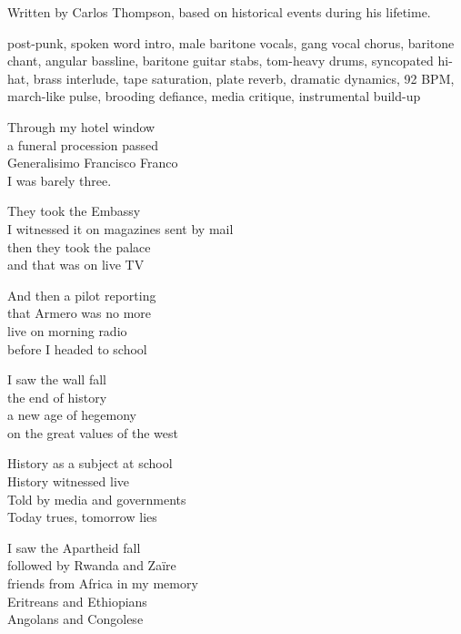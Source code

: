 
\label{sec:history-witnessed-live}
\begin{notes}
Written by Carlos Thompson, based on historical events during his lifetime.
\end{notes}
\begin{style}
post-punk, spoken word intro, male baritone vocals, gang vocal chorus, baritone chant, angular bassline, baritone guitar stabs, tom-heavy drums, syncopated hi-hat, brass interlude, tape saturation, plate reverb, dramatic dynamics, 92 BPM, march-like pulse, brooding defiance, media critique, instrumental build-up
\end{style}
\begin{lyrics}
Through my hotel window\\
a funeral procession passed\\
Generalisimo Francisco Franco\\
I was barely three.

They took the Embassy\\
I witnessed it on magazines sent by mail\\
then they took the palace\\
and that was on live TV

And then a pilot reporting\\
that Armero was no more\\
live on morning radio\\
before I headed to school

I saw the wall fall\\
the end of history\\
a new age of hegemony\\
on the great values of the west

History as a subject at school\\
History witnessed live\\
Told by media and governments\\
Today trues, tomorrow lies

I saw the Apartheid fall\\
followed by Rwanda and Zaïre\\
friends from Africa in my memory\\
Eritreans and Ethiopians\\
Angolans and Congolese


\end{lyrics}

